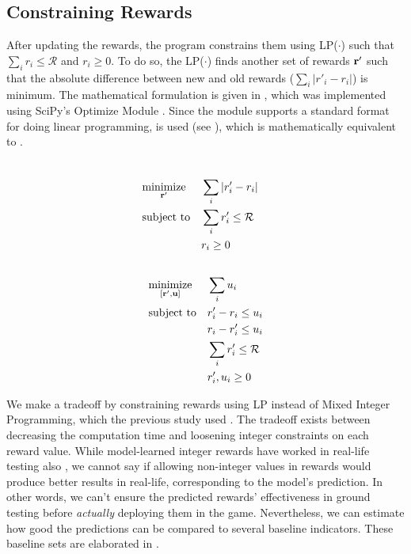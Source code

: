 \subsection{Constraining Rewards} \label{sec:Constraining Rewards}
After updating the rewards, the program constrains them using LP($\cdot$) such that $\sum_{i}r_i \leq \mathcal{R}$ and $r_i \geq 0$. To do so, the LP($\cdot$) finds another set of rewards $\mathbf{r'}$ such that the absolute difference between new and old rewards ($\sum_{i}|r'_i - r_i|$) is minimum. The mathematical formulation is given in , which was implemented using SciPy's Optimize Module \cite{SCPOptimizeDocs}. Since the module supports a standard format for doing linear programming,  is used (see ), which is mathematically equivalent to .
\begin{multicols}{2}
    \begin{equation} \label{eqn:lp_math_constrain_rewards}
        \begin{aligned}\\
            & \underset{\mathbf{r'}}{\text{minimize}}
            & & \sum_{i}|r'_i - r_i|\\
            & \text{subject to}
            & & \sum_{i}r'_i \leq \mathcal{R}\\
            &&& r_i \geq 0\\ \\
        \end{aligned}
    \end{equation}\break
    \begin{equation} \label{eqn:lp_code_constrain_rewards}
        \begin{aligned}
            & \underset{[\mathbf{r'}, \mathbf{u}]}{\text{minimize}}
            & & \sum_{i} u_i\\
            & \text{subject to}
            & & r'_i - r_i \leq u_i\\
            &&& r_i - r'_i \leq u_i\\
            &&& \sum_{i} r'_i \leq \mathcal{R}\\
            &&& r'_i, u_i \geq 0
        \end{aligned}
    \end{equation}
\end{multicols}

We make a tradeoff by constraining rewards using LP instead of Mixed Integer Programming, which the previous study used \cite{Xue2016Avi2}. The tradeoff exists between decreasing the computation time and loosening integer constraints on each reward value. While model-learned integer rewards have worked in real-life testing also \cite{Xue2016Avi2}, we cannot say if allowing non-integer values in rewards would produce better results in real-life, corresponding to the model's prediction. In other words, we can't ensure the predicted rewards' effectiveness in ground testing before \textit{actually} deploying them in the game. Nevertheless, we can estimate how good the predictions can be compared to several baseline indicators. These baseline sets are elaborated in .